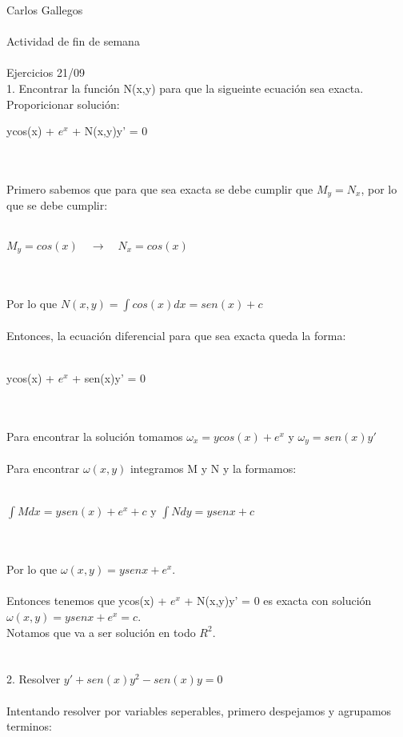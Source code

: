 \documentclass[a4paper,10pt]{article}
\title{}
\author{}
\date{}
\begin{document}
\maketitle
Carlos Gallegos\\\\
Actividad de fin de semana\\\\
Ejercicios 21/09\\
1. Encontrar la función N(x,y) para que la sigueinte ecuación sea exacta. Proporicionar solución:\\
\centerline{ycos(x) + $e^x$ + N(x,y)y' = 0 }\\\\
Primero sabemos que para que sea exacta se debe cumplir que $M_y = N_x$, por lo que se debe cumplir:\\\\
\centerline{$M_y = cos(x) \quad\rightarrow\quad N_x=cos(x)$}\\\\
Por lo que $N(x,y) = \int cos(x) dx = sen(x)+c$\\\\
Entonces, la ecuación diferencial para que sea exacta queda la forma:\\\\
\centerline{ycos(x) + $e^x$ + sen(x)y' = 0}\\\\
Para encontrar la solución tomamos $\omega_x = ycos(x) + e^x$ y $\omega_y=sen(x)y'$ \\\\
Para encontrar $\omega (x,y)$ integramos M y N y la formamos:\\\\
\centerline{$\int Mdx = ysen(x)+e^x + c$ y $\int N dy = ysenx + c$}\\\\
Por lo que $\omega (x,y) = ysenx + e^x$.\\\\
Entonces tenemos que ycos(x) + $e^x$ + N(x,y)y' = 0  es exacta con solución $\omega (x,y) = ysenx + e^x = c$.\\
Notamos que va a ser solución en todo $R^2$.\\\\\\
2. Resolver $y' + sen(x)y^2 -sen(x)y = 0$\\\\
Intentando resolver por variables seperables, primero despejamos y agrupamos terminos:\\\\
\end{document}
